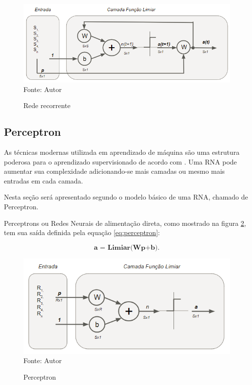 \documentclass[
	12pt,				%
    oneside,			%
	a4paper,			%
	english,			%
	french,				%
	spanish,			%
	brazil,				%
	]{abntex2}
\begin{document}
\begin{figure}[H]
    \centering
    \caption{Rede recorrente}
    \includegraphics[scale=0.75]{Rede_recorrente1}\\
    Fonte: Autor\hfill
    \label{fig:rederecorrente}
\end{figure}


\subsection{Perceptron}

As técnicas modernas utilizada em aprendizado de máquina são uma estrutura poderosa para o aprendizado supervisionado de acordo com . Uma RNA pode aumentar sua complexidade adicionando-se mais camadas ou mesmo mais entradas em cada camada. 

Nesta seção será apresentado segundo  o modelo básico de uma RNA, chamado de Perceptron. 


Perceptrons ou Redes Neurais de alimentação direta, como mostrado na figura \ref{fig:perceptron},  tem sua saída definida pela equação \ref{eq:perceptron}:

 \begin{equation}
    \textbf{a  = Limiar(Wp+b)}.
    \label{eq:perceptron}
  \end{equation} 
  
\begin{figure}[H]
    \centering
    \caption{Perceptron}
    \includegraphics[scale=1]{perceptron1}\\
    Fonte: Autor\hfill
    \label{fig:perceptron}
\end{figure}
\end{document}
